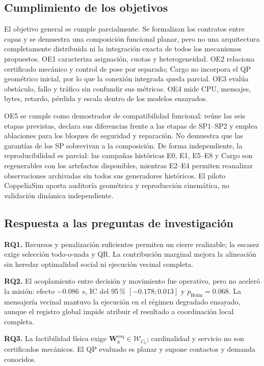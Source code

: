 \subsection{Cumplimiento de los objetivos}

El objetivo general se cumple parcialmente. Se formalizan los contratos entre
capas y se demuestra una composición funcional planar, pero no una arquitectura
completamente distribuida ni la integración exacta de todos los mecanismos
propuestos. OE1 caracteriza asignación, cuotas y heterogeneidad. OE2 relaciona
certificado mecánico y control de pose por separado; Cargo no incorpora el QP
geométrico inicial, por lo que la conexión integrada queda parcial. OE3 evalúa
obstáculo, fallo y tráfico sin confundir sus métricas. OE4 mide CPU, mensajes,
bytes, retardo, pérdida y escala dentro de los modelos ensayados.

OE5 se cumple como demostrador de compatibilidad funcional: reúne las seis
etapas previstas, declara sus diferencias frente a las etapas de SP1--SP2 y emplea ablaciones
para los bloques de seguridad y reparación. No demuestra que las garantías de
los SP sobrevivan a la composición. De forma independiente, la reproducibilidad
es parcial: las campañas históricas E0, E1, E5--E8 y Cargo son regenerables con los artefactos
disponibles, mientras E2--E4 permiten reanalizar observaciones archivadas sin
todos sus generadores históricos. El piloto CoppeliaSim aporta auditoría
geométrica y reproducción cinemática, no validación dinámica independiente.

\subsection{Respuesta a las preguntas de investigación}

\textbf{RQ1.} Recursos y penalización suficientes permiten un cierre realizable;
la escasez exige selección todo-o-nada y QR. La contribución marginal mejora la
alineación sin heredar optimalidad social ni ejecución vecinal completa.

\textbf{RQ2.} El acoplamiento entre decisión y movimiento fue operativo, pero no
aceleró la misión: efecto $-0.086$~s, IC del 95\,\% $[-0.178;0.013]$ y
$p_{\mathrm{Holm}}=0.068$. La mensajería vecinal mantuvo la ejecución en el
régimen degradado ensayado, aunque el registro global impide atribuir el
resultado a coordinación local completa.

\textbf{RQ3.} La factibilidad física exige
$\boldsymbol W_k^{\mathrm{req}}\in\mathcal W_{C_k}$; cardinalidad y servicio no
son certificados mecánicos. El QP evaluado es planar y supone contactos y
demanda conocidos.

